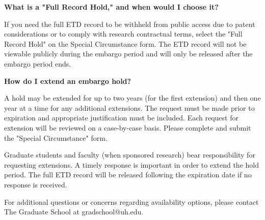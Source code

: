 \documentclass[12pt]{article}
\begin{document}
\bigskip

\noindent\textbf{What is a "Full Record Hold," and when would I choose it?}

\noindent If you need the full ETD record to be withheld from public access due to patent considerations or to comply with research contractual terms, select the "Full Record Hold" on the Special Circumstance form. The ETD record will not be viewable publicly during the embargo period and will only be released after the embargo period ends.

\bigskip

\noindent\textbf{How do I extend an embargo hold?}

\noindent A hold may be extended for up to two years (for the first extension) and then one year at a time for any additional extensions. The request must be made prior to expiration and appropriate justification must be included. Each request for extension will be reviewed on a case-by-case basis. Please complete and submit the "Special Circumstance" form.

\bigskip

\noindent Graduate students and faculty (when sponsored research) bear responsibility for requesting extensions. A timely response is important in order to extend the hold period. The full ETD record will be released following the expiration date if no response is received.

\bigskip

\noindent For additional questions or concerns regarding availability options, please contact The Graduate School at gradschool@uh.edu.
\end{document}

